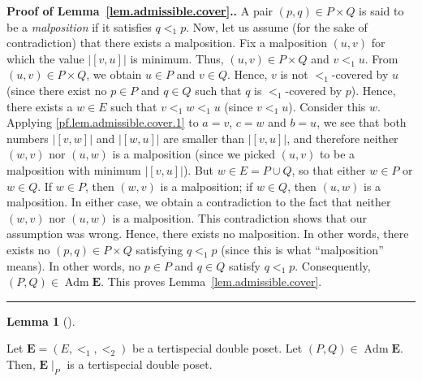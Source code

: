 \documentclass[numbers=enddot,12pt,final,onecolumn,notitlepage,abstracton]{scrartcl}%
\theoremstyle{definition}
\newtheorem{lem}[theo]{Lemma}
\newenvironment{lemma}[1][]
{\begin{lem}[#1]\begin{leftbar}}
{\end{leftbar}\end{lem}}
\newenvironment{proof}[1][Proof]{\noindent\textbf{#1.} }{\ \rule{0.5em}{0.5em}}
\newcommand{\Adm}{\operatorname{Adm}}
\newcommand{\EE}{{\mathbf{E}}}
\begin{document}
\begin{proof}[Proof of Lemma~\ref{lem.admissible.cover}.]
A pair $\left(p, q\right) \in P \times Q$ is said to be a
\textit{malposition} if it satisfies $q <_1 p$. Now, let us
assume (for the sake of contradiction) that there exists a
malposition. Fix a malposition $\left(u, v\right)$ for which the
value $\left|\left[v, u\right]\right|$ is minimum. Thus,
$\left(u, v\right) \in P \times Q$ and $v <_1 u$.
From $\left(u, v\right) \in P \times Q$, we obtain
$u \in P$ and $v \in Q$. Hence, $v$ is not
$<_1$-covered by $u$ (since there exist no $p \in P$ and $q \in Q$
such that $q$ is $<_1$-covered by $p$). Hence, there exists a
$w \in E$ such that $v <_1 w <_1 u$ (since $v <_1 u$). Consider
this $w$. Applying \eqref{pf.lem.admissible.cover.1} to $a = v$,
$c = w$ and $b = u$, we see that both numbers
$\left|\left[v, w\right]\right|$ and
$\left|\left[w, u\right]\right|$ are smaller than
$\left|\left[v, u\right]\right|$, and therefore neither
$\left(w, v\right)$ nor $\left(u, w\right)$ is a malposition
(since we picked $\left(u, v\right)$ to be a malposition with
minimum $\left|\left[v, u\right]\right|$). But
$w \in E = P \cup Q$, so that either $w \in P$ or $w \in Q$.
If $w \in P$, then $\left(w, v\right)$ is a malposition;
if $w \in Q$, then $\left(u, w\right)$ is a malposition. In
either case, we obtain a contradiction to the fact that
neither $\left(w, v\right)$ nor $\left(u, w\right)$ is a malposition.
This contradiction shows that our assumption was wrong.
Hence, there exists no malposition. In other words, there
exists no $\left(p, q\right) \in P \times Q$ satisfying
$q <_1 p$ (since this is what ``malposition'' means). In
other words, no $p \in P$ and $q \in Q$ satisfy $q <_1 p$.
Consequently, $\left(P, Q\right) \in \Adm \EE$.
This proves Lemma~\ref{lem.admissible.cover}.
\end{proof}

\begin{lemma}
\label{lem.tertispecial.subset}
Let $\EE = \left(E, <_1, <_2\right)$ be a tertispecial
double poset.
Let $\left(P,Q\right) \in \Adm \EE$. Then, $\EE\mid_P$ is
a tertispecial double poset.
\end{lemma}
\end{document}
